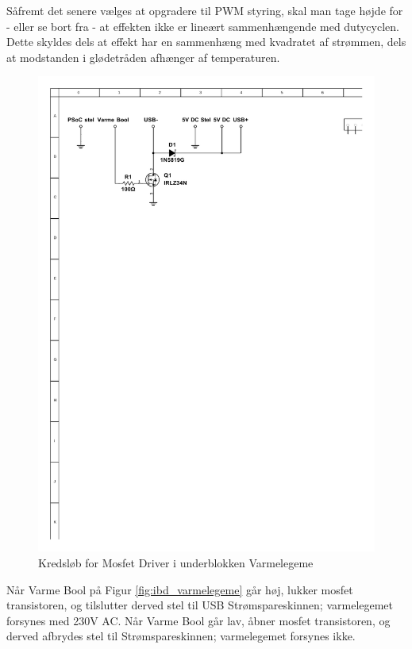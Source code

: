 Såfremt det senere vælges at opgradere til PWM styring, skal man tage højde for - eller se bort fra - at effekten ikke er lineært sammenhængende med dutycyclen. Dette skyldes dels at effekt har en sammenhæng med kvadratet af strømmen, dels at modstanden i glødetråden afhænger af temperaturen. 

\clearpage

\begin{figure}[h]
\centering 
\includegraphics[width={\textwidth-5cm}, trim= 50 610 220 70, clip=true] {../fig/multisim_varmelegeme_mosfetdriver.pdf}
\caption{Kredsløb for Mosfet Driver i underblokken Varmelegeme}
\label{fig:multisim_varmelegeme_mosfetdriver}
\end{figure}

Når Varme Bool på Figur \ref{fig:ibd_varmelegeme} går høj, lukker mosfet transistoren, og tilslutter derved stel til USB Strømspareskinnen; varmelegemet forsynes med 230V AC. 
Når Varme Bool går lav, åbner mosfet transistoren, og derved afbrydes stel til Strømspareskinnen; varmelegemet forsynes ikke.  

